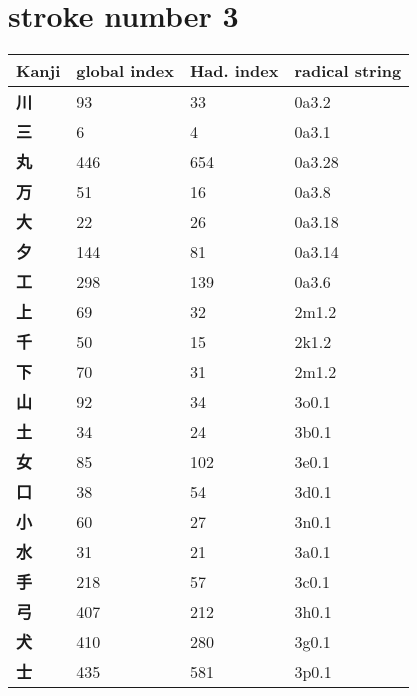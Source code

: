 \section{stroke number 3}
  \begin{longtable}[c]{llll}
    \bfseries Kanji & \bfseries global index & \bfseries Had. index & \bfseries radical string\\\hline\endhead
    \bfseries 川 & 93 & 33 & 0a3.2\\
    \bfseries 三 & 6 & 4 & 0a3.1\\
    \bfseries 丸 & 446 & 654 & 0a3.28\\
    \bfseries 万 & 51 & 16 & 0a3.8\\
    \bfseries 大 & 22 & 26 & 0a3.18\\
    \bfseries 夕 & 144 & 81 & 0a3.14\\
    \bfseries 工 & 298 & 139 & 0a3.6\\
    \bfseries 上 & 69 & 32 & 2m1.2\\
    \bfseries 千 & 50 & 15 & 2k1.2\\
    \bfseries 下 & 70 & 31 & 2m1.2\\
    \bfseries 山 & 92 & 34 & 3o0.1\\
    \bfseries 土 & 34 & 24 & 3b0.1\\
    \bfseries 女 & 85 & 102 & 3e0.1\\
    \bfseries 口 & 38 & 54 & 3d0.1\\
    \bfseries 小 & 60 & 27 & 3n0.1\\
    \bfseries 水 & 31 & 21 & 3a0.1\\
    \bfseries 手 & 218 & 57 & 3c0.1\\
    \bfseries 弓 & 407 & 212 & 3h0.1\\
    \bfseries 犬 & 410 & 280 & 3g0.1\\
    \bfseries 士 & 435 & 581 & 3p0.1\\
  \end{longtable}
